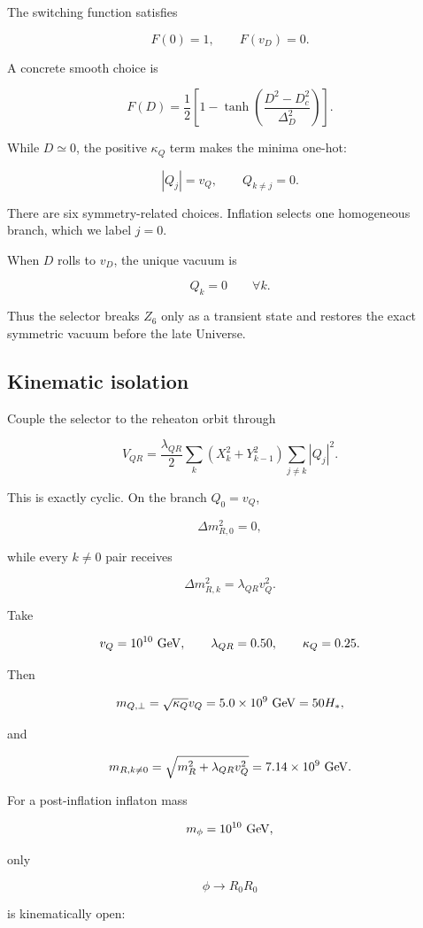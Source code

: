 \documentclass[
  10pt,
]{article}
\begin{document}
The switching function satisfies

\[
F(0)=1,
\qquad
F(v_D)=0.
\]

A concrete smooth choice is

\[
F(D)=
\frac12
\left[
1-\tanh\left(\frac{D^2-D_c^2}{\Delta_D^2}\right)
\right].
\]

While \(D\simeq0\), the positive \(\kappa_Q\) term makes the minima
one-hot:

\[
|Q_j|=v_Q,
\qquad
Q_{k\neq j}=0.
\]

There are six symmetry-related choices. Inflation selects one
homogeneous branch, which we label \(j=0\).

When \(D\) rolls to \(v_D\), the unique vacuum is

\[
Q_k=0
\qquad
\forall k.
\]

Thus the selector breaks \(Z_6\) only as a transient state and restores
the exact symmetric vacuum before the late Universe.

\subsection{Kinematic isolation}\label{kinematic-isolation}

Couple the selector to the reheaton orbit through

\[
V_{QR}
=
\frac{\lambda_{QR}}2
\sum_k
\left(X_k^2+Y_{k-1}^2\right)
\sum_{j\neq k}|Q_j|^2.
\]

This is exactly cyclic. On the branch \(Q_0=v_Q\),

\[
\Delta m_{R,0}^2=0,
\]

while every \(k\neq0\) pair receives

\[
\Delta m_{R,k}^2
=
\lambda_{QR}v_Q^2.
\]

Take

\[
v_Q=10^{10}\ {\rm GeV},
\qquad
\lambda_{QR}=0.50,
\qquad
\kappa_Q=0.25.
\]

Then

\[
m_{Q,\perp}
=
\sqrt{\kappa_Q}v_Q
=5.0\times10^9\ {\rm GeV}
=50H_*,
\]

and

\[
m_{R,k\neq0}
=
\sqrt{m_R^2+\lambda_{QR}v_Q^2}
=7.14\times10^9\ {\rm GeV}.
\]

For a post-inflation inflaton mass

\[
m_\phi=10^{10}\ {\rm GeV},
\]

only

\[
\phi\to R_0R_0
\]

is kinematically open:
\end{document}
